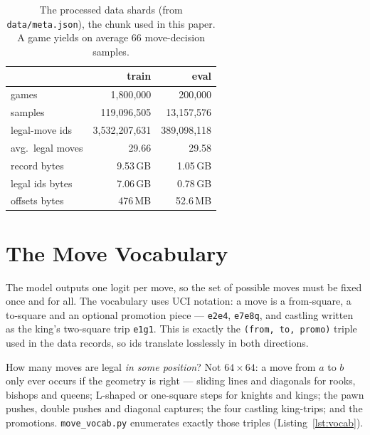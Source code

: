\documentclass[10pt,a4paper]{article}
\newcommand{\code}[1]{\texttt{#1}}
\begin{document}
\begin{table}[htbp]
\centering
\small
\begin{tabular}{@{}lrr@{}}
\toprule
 & \textbf{train} & \textbf{eval} \\
\midrule
games             & 1{,}800{,}000      & 200{,}000 \\
samples           & 119{,}096{,}505    & 13{,}157{,}576 \\
legal-move ids    & 3{,}532{,}207{,}631 & 389{,}098{,}118 \\
avg.\ legal moves & 29.66              & 29.58 \\
record bytes      & 9.53\,GB           & 1.05\,GB \\
legal ids bytes   & 7.06\,GB           & 0.78\,GB \\
offsets bytes     & 476\,MB            & 52.6\,MB \\
\bottomrule
\end{tabular}
\caption{The processed data shards (from \code{data/meta.json}), the
chunk used in this paper. A game yields on average 66 move-decision
samples.}
\label{tab:dataset}
\end{table}

\section{The Move Vocabulary}\label{sec:vocab}

The model outputs one logit per move, so the set of possible moves must be
fixed once and for all. The vocabulary uses UCI notation: a move is a
from-square, a to-square and an optional promotion piece --- \code{e2e4},
\code{e7e8q}, and castling written as the king's two-square trip
\code{e1g1}. This is exactly the \code{(from, to, promo)} triple used in
the data records, so ids translate losslessly in both directions.

How many moves are legal \emph{in some position}? Not $64\times64$: a move
from $a$ to $b$ only ever occurs if the geometry is right --- sliding
lines and diagonals for rooks, bishops and queens; L-shaped or
one-square steps for knights and kings; the pawn pushes, double pushes and
diagonal captures; the four castling king-trips; and the promotions.
\verb|move_vocab.py| enumerates exactly those triples
(Listing~\ref{lst:vocab}).
\end{document}
